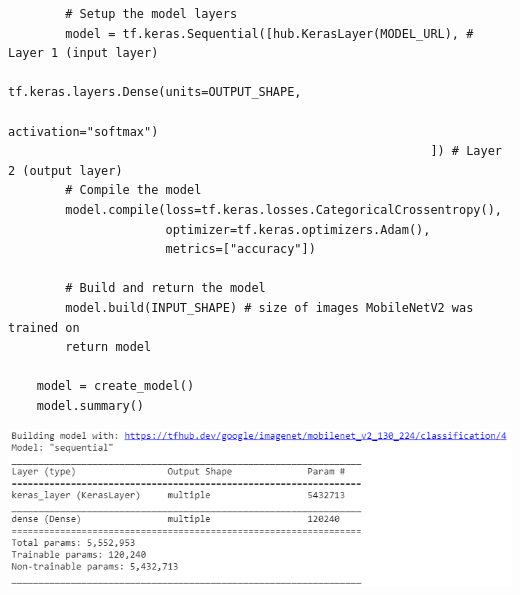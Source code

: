 \documentclass[11pt, a4paper]{article}
\begin{document}
\begin{spacing}{1.1}
\begin{lstlisting}
		# Setup the model layers
		model = tf.keras.Sequential([hub.KerasLayer(MODEL_URL), # Layer 1 (input layer)
		                             tf.keras.layers.Dense(units=OUTPUT_SHAPE,
		                                                   activation="softmax")
		                                                   ]) # Layer 2 (output layer)
		# Compile the model
		model.compile(loss=tf.keras.losses.CategoricalCrossentropy(),
		              optimizer=tf.keras.optimizers.Adam(),	
		              metrics=["accuracy"])
		
		# Build and return the model
		model.build(INPUT_SHAPE) # size of images MobileNetV2 was trained on
		return model
	
	model = create_model()
	model.summary() \end{lstlisting} \vspace*{1mm}
	\includegraphics[scale=.6]{model_sum} \newpage


\end{spacing}
\end{document}
